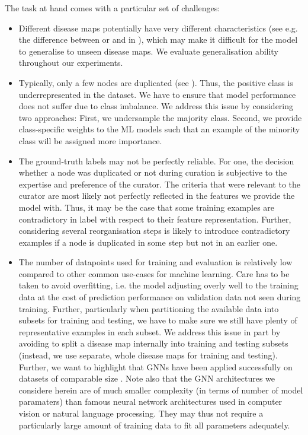 \documentclass[
	fontsize=10pt, %
	twoside=true, %
	secnumdepth=1, %
  toc=indentunnumbered %
]{kaobook}
\begin{document}
The task at hand comes with a particular set of challenges:
\begin{itemize}
\item Different disease maps potentially have very different characteristics
  (see e.g. the difference between \ADMap{} or \PDMap{} and \ReconMap in
  ), which may make it difficult for the model to
  generalise to unseen disease maps. We evaluate generalisation ability
  throughout our experiments.
\item Typically, only a few nodes are duplicated (see ).
  Thus, the positive class is underrepresented in the dataset. We have to ensure that
  model performance does not suffer due to class imbalance. We address this
  issue by considering two approaches: First, we undersample the majority class.
  Second, we provide class-specific weights to the ML models such that an
  example of the minority class will be assigned more importance.
\item The ground-truth labels may not be perfectly reliable.
  For one, the decision whether a node was duplicated or not during curation is
  subjective to the expertise and preference of the curator. The criteria that
  were relevant to the curator are most likely not perfectly reflected in the
  features we provide the model with.
  Thus, it may be the case that some
  training examples are contradictory in label with respect to their feature
  representation. Further, considering several reorganisation steps is likely to
  introduce contradictory examples if a node is duplicated in some step but not
  in an earlier one. 
\item The number of datapoints used for training and evaluation is relatively
  low compared to other common use-cases for machine learning. Care has to be
  taken to avoid overfitting, i.e. the model adjusting overly well to the training
  data at the cost of prediction performance on validation data not seen during
  training. Further, particularly when partitioning the available data into
  subsets for training and testing, we have to make sure we still have plenty of
  representative examples in each subset. We address this issue in part by avoiding to
  split a disease map internally into training and testing subsets (instead, we
  use separate, whole disease maps for training and testing). Further, we
  want to highlight that GNNs have been applied successfully on datasets
  of comparable size \cite{schulte-sasse_IntegrationMultiomicsData_2021}.
  Note also that the GNN architectures we considere herein are of
  much smaller complexity (in terms of number of model paramaters) than famous
  neural network architectures used in computer vision or natural language
  processing. They may thus not require a particularly large amount of training
  data to fit all parameters adequately.
\end{itemize}
\end{document}
